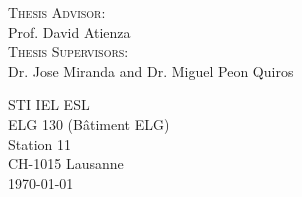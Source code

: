 \begin{titlepage}
    \begin{multicols}{2}
    
    \flushleft
    
    \textsc{Thesis Advisor:}
    \\
    Prof. David Atienza
    \\ [0.25cm]
    \textsc{Thesis Supervisors:}
    \\
    Dr. Jose Miranda and Dr. Miguel Peon Quiros
    
    \flushright
    
    STI IEL ESL
    \\
    ELG 130 (Bâtiment ELG)
    \\
    Station 11
    \\
    CH-1015 Lausanne
    \\
    \today
    
    \end{multicols}
\end{titlepage}